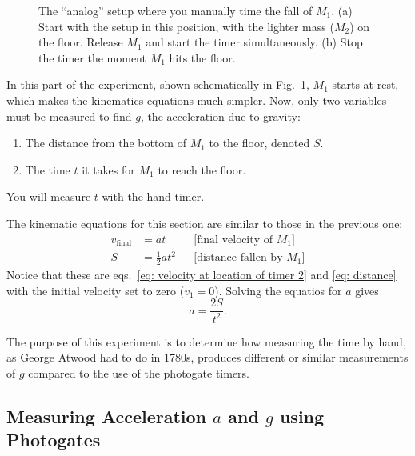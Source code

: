 \documentclass[addpoints]{physlabs}
\begin{document}
\begin{labsection}
\begin{theory}
\begin{figure}[ht]
    \centering
    
    \caption{The ``analog'' setup where you manually time the fall of $M_1$. (a) Start with the setup in this position, with the lighter mass ($M_2$) on the floor. Release $M_1$ and start the timer simultaneously. (b) Stop the timer the moment $M_1$ hits the floor.}
    \label{fig: atwood setup manual}
\end{figure}

In this part of the experiment, shown schematically in Fig.~\ref{fig: atwood setup manual}, $M_1$ starts at rest, which makes the kinematics equations much simpler. Now, only two variables must be measured to find $g$, the acceleration due to gravity:
%
\begin{enumerate}
    \item The distance from the bottom of $M_1$ to the floor, denoted $S$.
    \item The time $t$ it takes for $M_1$ to reach the floor.
\end{enumerate}
%
You will measure $t$ with the hand timer.

The kinematic equations for this section are similar to those in the previous one:
%
\begin{align}
    v_\text{final} &= at & &\text{[final velocity of $M_1$]} \label{eq: atwood final velocity}
    \\
    S &= \frac{1}{2}at^2 & &\text{[distance fallen by $M_1$]} \label{eq: atwood distance}
\end{align}
%
Notice that these are eqs.~\ref{eq: velocity at location of timer 2} and \ref{eq: distance} with the initial velocity set to zero ($v_1=0$). Solving the equatios for $a$ gives
%
\begin{equation}\label{eq: acceleration simple}
    a = \frac{2S}{t^2}.
\end{equation}

The purpose of this experiment is to determine how measuring the time by hand, as George Atwood had to do in 1780s, produces different or similar measurements of $g$ compared to the use of the photogate timers.

\end{theory}
    
\begin{experiment}

\subsection*{Measuring Acceleration $a$ and $g$ using Photogates}


\end{experiment}
\end{labsection}
\end{document}
